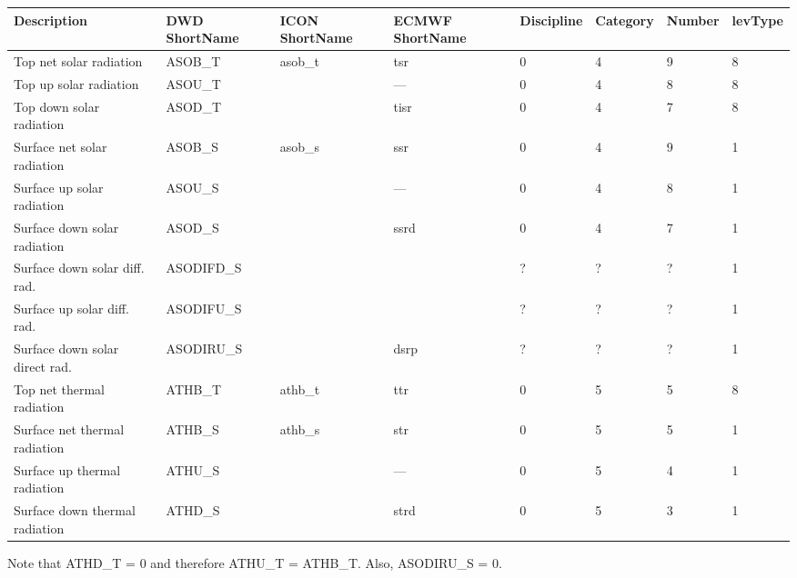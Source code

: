 \documentclass[11pt,notitlepage]{article}  %
\begin{document}
\vspace{1cm}
\hspace{-2cm}
\begin{centering}
\begin{tabular}{l p{2.5cm} p{2.5cm} p{2.5cm} l l l l}  

\textbf{Description}           & \textbf{DWD \linebreak ShortName} 
                               & \textbf{ICON \linebreak ShortName} 
                               & \textbf{ECMWF \linebreak ShortName} 
                               & \textbf{Discipline} & \textbf{Category} & \textbf{Number} & \textbf{levType} \\
\hline                                                                                                                                                                          

Top net solar radiation        &  ASOB\_T     &  asob\_t     &  tsr        &  0        &  4      &  9       &  8      \\
Top up solar radiation         &  ASOU\_T     &              &  ---        &  0        &  4      &  8       &  8      \\
Top down solar radiation       &  ASOD\_T     &              &  tisr       &  0        &  4      &  7       &  8      \\
Surface net solar radiation    &  ASOB\_S     &  asob\_s     &  ssr        &  0        &  4      &  9       &  1      \\
Surface up solar radiation     &  ASOU\_S     &              &  ---        &  0        &  4      &  8       &  1      \\
Surface down solar radiation   &  ASOD\_S     &              &  ssrd       &  0        &  4      &  7       &  1      \\

Surface down solar diff. rad.  &  ASODIFD\_S  &              &             &  ?        &  ?      &  ?       &  1      \\
Surface up solar diff. rad.    &  ASODIFU\_S  &              &             &  ?        &  ?      &  ?       &  1      \\
Surface down solar direct rad. &  ASODIRU\_S  &              &  dsrp       &  ?        &  ?      &  ?       &  1      \\


Top net thermal radiation      &  ATHB\_T     &  athb\_t     &  ttr        &  0        &  5      &  5       &  8      \\
Surface net thermal radiation  &  ATHB\_S     &  athb\_s     &  str        &  0        &  5      &  5       &  1      \\
Surface up thermal radiation   &  ATHU\_S     &              &  ---        &  0        &  5      &  4       &  1      \\
Surface down thermal radiation &  ATHD\_S     &              &  strd       &  0        &  5      &  3       &  1      \\

\hline
\end{tabular}
\end{centering}
\vspace{1cm}

Note that ATHD\_T = 0 and therefore ATHU\_T = ATHB\_T.  Also, ASODIRU\_S = 0.
\end{document}
